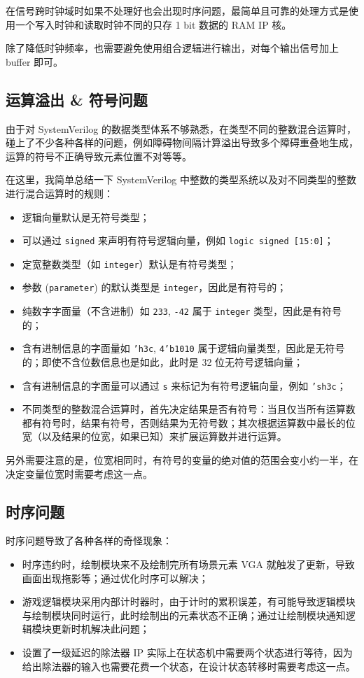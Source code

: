 \documentclass[UTF8, 11pt, fontset=none]{ctexart}
\begin{document}
在信号跨时钟域时如果不处理好也会出现时序问题，最简单且可靠的处理方式是使用一个写入时钟和读取时钟不同的只存 1 bit 数据的 RAM IP 核。

除了降低时钟频率，也需要避免使用组合逻辑进行输出，对每个输出信号加上 buffer 即可。

\subsection{运算溢出 \& 符号问题}

由于对 SystemVerilog 的数据类型体系不够熟悉，在类型不同的整数混合运算时，碰上了不少各种各样的问题，例如障碍物间隔计算溢出导致多个障碍重叠地生成，运算的符号不正确导致元素位置不对等等。

在这里，我简单总结一下 SystemVerilog 中整数的类型系统以及对不同类型的整数进行混合运算时的规则：
\begin{itemize}
    \item 逻辑向量默认是无符号类型；
    \item 可以通过 \texttt{signed} 来声明有符号逻辑向量，例如 \texttt{logic signed [15:0]}；
    \item 定宽整数类型（如 \texttt{integer}）默认是有符号类型；
    \item 参数 (\texttt{parameter}) 的默认类型是 \texttt{integer}，因此是有符号的；
    \item 纯数字字面量（不含进制）如 \texttt{233}, \texttt{-42} 属于 \texttt{integer} 类型，因此是有符号的；
    \item 含有进制信息的字面量如 \texttt{'h3c}, \texttt{4'b1010} 属于逻辑向量类型，因此是无符号的；即使不含位数信息也是如此，此时是 32 位无符号逻辑向量；
    \item 含有进制信息的字面量可以通过 \texttt{s} 来标记为有符号逻辑向量，例如 \texttt{'sh3c}；
    \item 不同类型的整数混合运算时，首先决定结果是否有符号：当且仅当所有运算数都有符号时，结果有符号，否则结果为无符号数；其次根据运算数中最长的位宽（以及结果的位宽，如果已知）来扩展运算数并进行运算。
\end{itemize}

另外需要注意的是，位宽相同时，有符号的变量的绝对值的范围会变小约一半，在决定变量位宽时需要考虑这一点。

\subsection{时序问题}

时序问题导致了各种各样的奇怪现象：
\begin{itemize}
    \item 时序违约时，绘制模块来不及绘制完所有场景元素 VGA 就触发了更新，导致画面出现拖影等；通过优化时序可以解决；
    \item 游戏逻辑模块采用内部计时器时，由于计时的累积误差，有可能导致逻辑模块与绘制模块同时运行，此时绘制出的元素状态不正确；通过让绘制模块通知逻辑模块更新时机解决此问题；
    \item 设置了一级延迟的除法器 IP 实际上在状态机中需要两个状态进行等待，因为给出除法器的输入也需要花费一个状态，在设计状态转移时需要考虑这一点。
\end{itemize}
\end{document}
